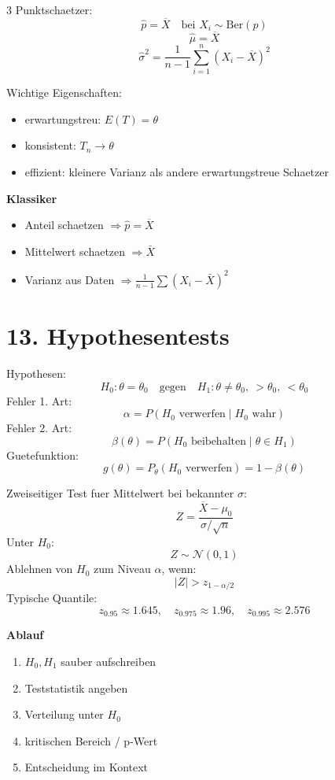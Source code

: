 \documentclass[a4paper,8pt,landscape]{article}
\newcommand{\Normal}{\mathcal{N}}
\newcommand{\Ber}{\mathrm{Ber}}
\begin{document}
\begin{multicols*}{3}
Punktschaetzer:
\[
\hat p=\overline X\quad \text{bei } X_i\sim\Ber(p)
\]
\[
\hat \mu=\overline X
\]
\[
\hat \sigma^2=\frac{1}{n-1}\sum_{i=1}^n (X_i-\overline X)^2
\]

Wichtige Eigenschaften:
\begin{itemize}
  \item erwartungstreu: $E(T)=\theta$
  \item konsistent: $T_n\to \theta$
  \item effizient: kleinere Varianz als andere erwartungstreue Schaetzer
\end{itemize}

\textbf{Klassiker}
\begin{itemize}
  \item Anteil schaetzen $\Rightarrow \hat p=\overline X$
  \item Mittelwert schaetzen $\Rightarrow \bar X$
  \item Varianz aus Daten $\Rightarrow \frac{1}{n-1}\sum (X_i-\bar X)^2$
\end{itemize}

\section*{13. Hypothesentests}
Hypothesen:
\[
H_0:\theta=\theta_0 \quad\text{gegen}\quad H_1:\theta\neq \theta_0,\ >\theta_0,\ <\theta_0
\]
Fehler 1. Art:
\[
\alpha=P(\text{$H_0$ verwerfen}\mid H_0\text{ wahr})
\]
Fehler 2. Art:
\[
\beta(\theta)=P(\text{$H_0$ beibehalten}\mid \theta\in H_1)
\]
Guetefunktion:
\[
g(\theta)=P_\theta(\text{$H_0$ verwerfen})=1-\beta(\theta)
\]

Zweiseitiger Test fuer Mittelwert bei bekannter $\sigma$:
\[
Z=\frac{\overline X-\mu_0}{\sigma/\sqrt n}
\]
Unter $H_0$:
\[
Z\sim \Normal(0,1)
\]
Ablehnen von $H_0$ zum Niveau $\alpha$, wenn:
\[
|Z|>z_{1-\alpha/2}
\]
Typische Quantile:
\[
z_{0.95}\approx 1.645,\quad z_{0.975}\approx 1.96,\quad z_{0.995}\approx 2.576
\]

\textbf{Ablauf}
\begin{enumerate}
  \item $H_0,H_1$ sauber aufschreiben
  \item Teststatistik angeben
  \item Verteilung unter $H_0$
  \item kritischen Bereich / p-Wert
  \item Entscheidung im Kontext
\end{enumerate}


\end{multicols*}
\end{document}
